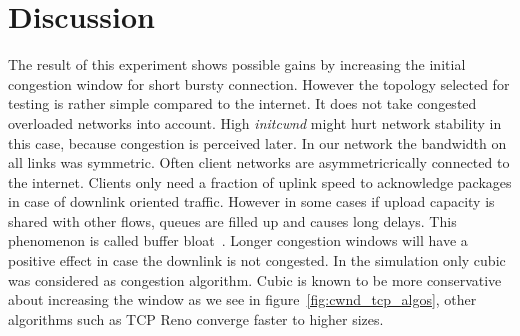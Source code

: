 \section{Discussion}
\label{sec:discussion}

The result of this experiment shows possible gains by increasing the initial
congestion window for short bursty connection. However the topology selected for
testing is rather simple compared to the internet. It does not take congested
overloaded networks into account. High \emph{initcwnd} might hurt network
stability in this case, because congestion is perceived later. In our network
the bandwidth on all links was symmetric. Often client networks are
asymmetricrically connected to the internet. Clients only need a fraction of
uplink speed to acknowledge packages in case of downlink oriented traffic.
However in some cases if upload capacity is shared with other flows, queues are
filled up and causes long delays. This phenomenon is called buffer
bloat~\cite{rfc970}. Longer congestion windows will have a positive effect in
case the downlink is not congested. In the simulation only cubic was considered
as congestion algorithm. Cubic is known to be more conservative about increasing
the window as we see in figure~\ref{fig:cwnd_tcp_algos}, other algorithms such
as TCP Reno converge faster to higher sizes.
